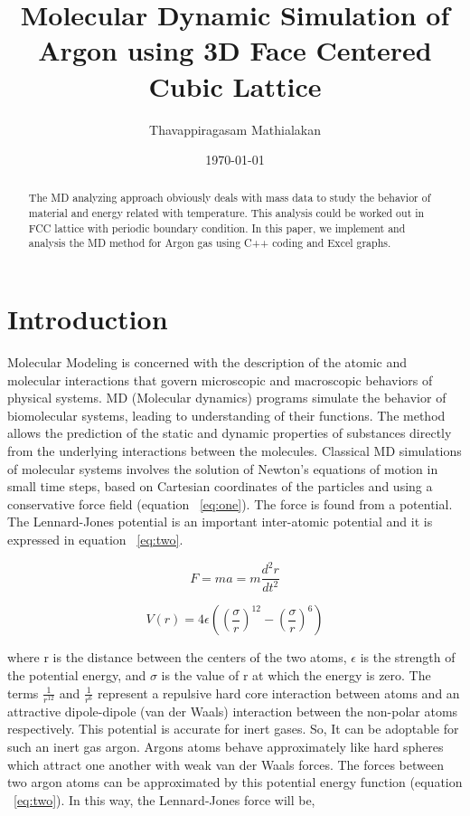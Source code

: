 \documentclass[]{article}
\begin{document}
\title{Molecular Dynamic Simulation of Argon using 3D Face Centered Cubic Lattice}%
\author{Thavappiragasam Mathialakan}
\date{\today}%
\maketitle

\begin{abstract}
The MD analyzing approach obviously deals with mass data to study the behavior of material and energy related with temperature. This analysis could be worked out in FCC lattice with periodic boundary condition. In this paper, we implement and analysis the MD method for Argon gas using C++ coding and Excel graphs. 
\end{abstract}


\section{Introduction} %
\label{sec:level1} %

Molecular Modeling is concerned with the description of the atomic and molecular interactions that govern microscopic and macroscopic behaviors of physical systems. MD (Molecular dynamics) programs simulate the behavior of biomolecular systems, leading to understanding of their functions. The method allows the prediction of the static and dynamic properties of substances directly from the underlying interactions between the molecules.  Classical MD simulations of molecular systems involves the solution of Newton's equations of motion in small time steps, based on Cartesian coordinates of the particles and using a conservative force field (equation ~\ref{eq:one}). The force is found from a potential. The Lennard-Jones potential is an important inter-atomic potential and it is expressed in equation ~\ref{eq:two}. 

\begin{equation}
\label{eq:one}
F = ma = m\frac{d^2r}{dt^2}
\end{equation}

\begin{equation}
\label{eq:two}
V(r) =4\epsilon({(\frac{\sigma}{r})}^{12} - {(\frac{\sigma}{r})}^6)
\end{equation}

where r is the distance between the centers of the two atoms, $\epsilon$ is the strength of the potential energy, and $\sigma$ is the value of r at which the energy is zero. The terms $\frac{1}{r^{12}}$ and $\frac{1}{r^6}$ represent a repulsive hard core interaction between atoms and an attractive dipole-dipole (van der Waals) interaction between the non-polar atoms respectively. This potential is accurate for inert gases. So, It can be adoptable for such an inert gas argon. Argons atoms behave approximately like hard spheres which attract one another with weak van der Waals forces. The forces between two argon atoms can be approximated by this potential energy function (equation ~\ref{eq:two}). In this way, the Lennard-Jones force will be, 
\end{document}
